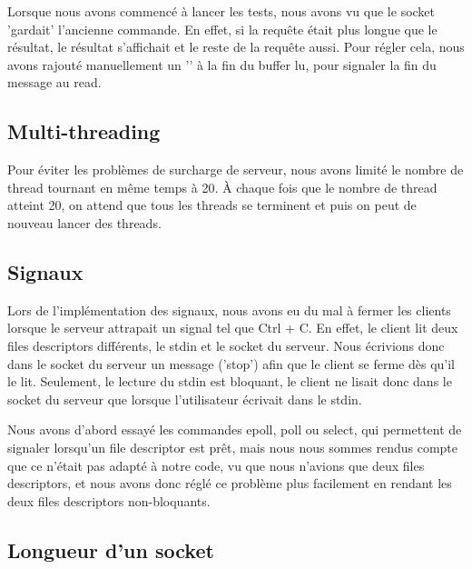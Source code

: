 \documentclass[utf8]{article}
\begin{document}
\begin{large}
Lorsque nous avons commencé à lancer les tests, nous avons vu que le socket
'gardait' l'ancienne commande. En effet, si la requête était plus longue que le
résultat, le résultat s'affichait et le reste de la requête aussi. Pour régler
cela, nous avons rajouté manuellement un '' à la fin du buffer lu, pour
signaler la fin du message au read.   

\par
\subsection{Multi-threading}

\par 
\indent

Pour éviter les problèmes de surcharge de serveur, nous avons limité le nombre
de thread tournant en même temps à 20.
À chaque fois que le nombre de thread atteint 20, on attend que tous les threads se terminent 
et puis on peut de nouveau lancer des threads.
\par
\subsection{Signaux}
\par
\indent

Lors de l'implémentation des signaux, nous avons eu du mal à fermer les clients
lorsque le serveur attrapait un signal tel que Ctrl + C. En effet, le client lit
deux files descriptors différents, le stdin et le socket du serveur. Nous
écrivions donc dans le socket du serveur un message ('stop') afin que le client
se ferme dès qu'il le lit. Seulement, le lecture du stdin est bloquant, le
client ne lisait donc dans le socket du serveur que lorsque l'utilisateur
écrivait dans le stdin. 
\par
\par
Nous avons d'abord essayé les commandes epoll, poll ou select, qui permettent de
signaler lorsqu'un file descriptor est prêt, mais nous nous sommes rendus compte
que ce n'était pas adapté à notre code, vu que nous n'avions que deux files
descriptors, et nous avons donc réglé ce problème plus facilement en rendant les
deux files descriptors non-bloquants.
\par
\subsection{Longueur d'un socket}
\par
\indent


\end{large}
\end{document}
